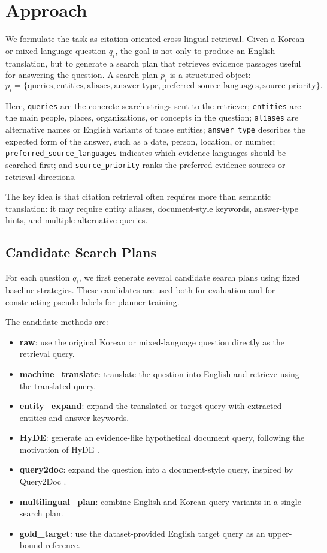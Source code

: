 \documentclass{article}
\begin{document}
\section{Approach}
\label{sec:approach}

We formulate the task as citation-oriented cross-lingual retrieval. Given a Korean or mixed-language question $q_i$, the goal is not only to produce an English translation, but to generate a search plan that retrieves evidence passages useful for answering the question. A search plan $p_i$ is a structured object:
\[
p_i = \{\text{queries}, \text{entities}, \text{aliases}, \text{answer\_type},
\text{preferred\_source\_languages}, \text{source\_priority}\}.
\]

Here, \texttt{queries} are the concrete search strings sent to the retriever; 
\texttt{entities} are the main people, places, organizations, or concepts in the question; 
\texttt{aliases} are alternative names or English variants of those entities; 
\texttt{answer\_type} describes the expected form of the answer, such as a date, person, location, or number; 
\texttt{preferred\_source\_languages} indicates which evidence languages should be searched first; 
and \texttt{source\_priority} ranks the preferred evidence sources or retrieval directions.

The key idea is that citation retrieval often requires more than semantic translation: it may require entity aliases, document-style keywords, answer-type hints, and multiple alternative queries.

\subsection{Candidate Search Plans}

For each question $q_i$, we first generate several candidate search plans using fixed baseline strategies. These candidates are used both for evaluation and for constructing pseudo-labels for planner training.

The candidate methods are:
\begin{itemize}
    \item \textbf{raw}: use the original Korean or mixed-language question directly as the retrieval query.
    \item \textbf{machine\_translate}: translate the question into English and retrieve using the translated query.
    \item \textbf{entity\_expand}: expand the translated or target query with extracted entities and answer keywords.
    \item \textbf{HyDE}: generate an evidence-like hypothetical document query, following the motivation of HyDE \cite{gao2022precise}.
    \item \textbf{query2doc}: expand the question into a document-style query, inspired by Query2Doc \cite{wang2023query2doc}.
    \item \textbf{multilingual\_plan}: combine English and Korean query variants in a single search plan.
    \item \textbf{gold\_target}: use the dataset-provided English target query as an upper-bound reference.
\end{itemize}
\end{document}
